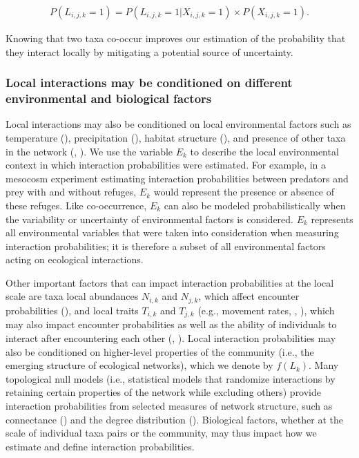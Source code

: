 \begin{eqnarray}
  \label{eq:co-occur}
    P(L_{i, j, k} = 1) = P(L_{i, j, k} = 1| X_{i,j,k} = 1) \times P(X_{i,j,k} =
    1).
\end{eqnarray}

Knowing that two taxa co-occur improves our estimation of the probability that
they interact locally by mitigating a potential source of uncertainty.

\subsubsection{Local interactions may be conditioned on different environmental and biological factors}

Local interactions may also be conditioned on local environmental factors such
as temperature (\cite{Angilletta2004Temperature}), precipitation
(\cite{Woodward2012Climate}), habitat structure (\cite{Klecka2014Effect}), and
presence of other taxa in the network (\cite{Pilosof2017Multilayer},
\cite{Kefi2012More}). We use the variable $E_k$ to describe the local
environmental context in which interaction probabilities were estimated. For
example, in a mesocosm experiment estimating interaction probabilities between
predators and prey with and without refuges, $E_k$ would represent the presence
or absence of these refuges. Like co-occurrence, $E_k$ can also be modeled
probabilistically when the variability or uncertainty of environmental factors
is considered. $E_k$ represents all environmental variables that were taken into
consideration when measuring interaction probabilities; it is therefore a subset
of all environmental factors acting on ecological interactions. 

Other important factors that can impact interaction probabilities at the local
scale are taxa local abundances $N_{i,k}$ and $N_{j,k}$, which affect encounter
probabilities (\cite{Canard2012Emergence}), and local traits $T_{i,k}$ and
$T_{j,k}$ (e.g., movement rates, \cite{Beardsell2021Derivation},
\cite{Cherif2024Environment}), which may also impact encounter probabilities as
well as the ability of individuals to interact after encountering each other
(\cite{Caron2024Traitmatching}, \cite{Poisot2015Species}). Local interaction
probabilities may also be conditioned on higher-level properties of the
community (i.e., the emerging structure of ecological networks), which we denote
by $f(L_k)$. Many topological null models (i.e., statistical models that
randomize interactions by retaining certain properties of the network while
excluding others) provide interaction probabilities from selected measures of
network structure, such as connectance (\cite{Fortuna2006Habitat}) and the
degree distribution (\cite{Bascompte2003Nested}). Biological factors, whether at
the scale of individual taxa pairs or the community, may thus impact how we
estimate and define interaction probabilities.

